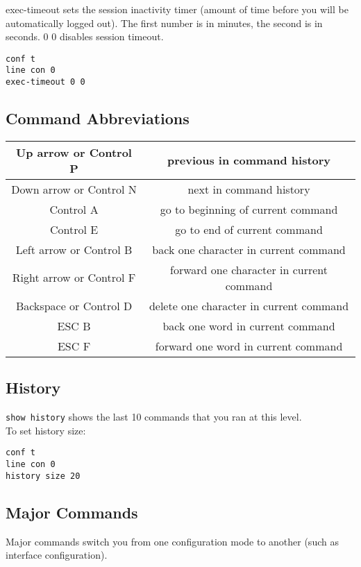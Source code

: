 exec-timeout sets the session inactivity timer (amount of time before you will
be automatically logged out). The first number is in minutes, the second
is in seconds. 0 0 disables session timeout.

\begin{verbatim}
conf t
line con 0
exec-timeout 0 0
\end{verbatim}

\subsection{Command Abbreviations}

\begin{tabular}{ | c | c | }
\hline
Up arrow or Control P & previous in command history \\ \hline
Down arrow or Control N & next in command history \\ \hline
Control A & go to beginning of current command \\ \hline
Control E & go to end of current command \\ \hline
Left arrow or Control B & back one character in current command \\ \hline
Right arrow or Control F & forward one character in current command \\ \hline
Backspace or Control D & delete one character in current command \\ \hline
ESC B & back one word in current command \\ \hline
ESC F & forward one word in current command \\ \hline
\end{tabular}

\subsection{History}

\texttt{show history} shows the last 10 commands that you ran at this level.\\

To set history size:

\begin{verbatim}
conf t
line con 0
history size 20
\end{verbatim}

\subsection{Major Commands}

Major commands switch you from one configuration mode to another (such as
interface configuration).
